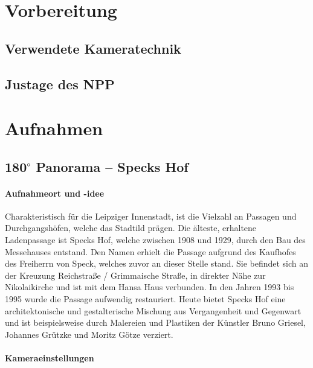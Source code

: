\documentclass[liststotoc,bibtotoc,fontsize=14pt,]{scrreprt}
\begin{document}
	\chapter{Vorbereitung}
	\label{ch:vorbereitung}
	
	\section{Verwendete Kameratechnik}
	\label{sec:technik}
	
	\section{Justage des NPP}
	\label{sec:npp}
	
	\chapter{Aufnahmen}
	\label{ch:aufnahmen}
	
	\section{180$^\circ$ Panorama -- Speck\grq s Hof}
	\label{sec:specks}

	\subsubsection{Aufnahmeort und -idee}
	Charakteristisch für die Leipziger Innenstadt, ist die Vielzahl an Passagen und Durchgangshöfen, welche das Stadtild prägen. Die älteste, erhaltene Ladenpassage ist Speck\grq s Hof, welche zwischen 1908 und 1929, durch den Bau des Messehauses entstand. Den Namen erhielt die Passage aufgrund des Kaufhofes des Freiherrn von Speck, welches zuvor an dieser Stelle stand. Sie befindet sich an der Kreuzung Reichstraße / Grimmaische Straße, in direkter Nähe zur Nikolaikirche und ist mit dem Hansa Haus verbunden. In den Jahren 1993 bis 1995 wurde die Passage aufwendig restauriert. Heute bietet Speck\grq s Hof eine architektonische und gestalterische Mischung aus Vergangenheit und Gegenwart und ist beispielsweise durch Malereien und Plastiken der Künstler Bruno Griesel, Johannes Grützke und Moritz Götze verziert.
	
	\bigskip
	
	
	\subsubsection{Kameraeinstellungen}
	
\end{document}
